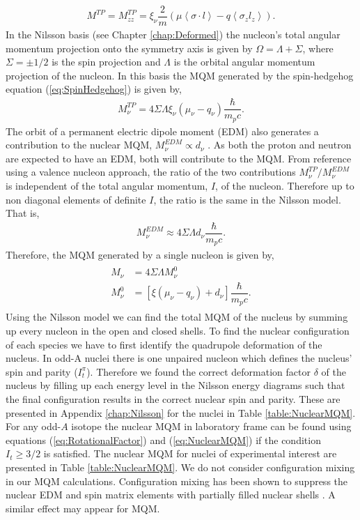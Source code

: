 \documentclass[10pt,a4paper, twoside, openright]{report}
\begin{document}
\begin{align}
M^{TP}  = M_{zz}^{TP} = \xi_{\nu}\dfrac{2}{m}\left(\mu\left<\sigma\cdot l \right> - q\left<\sigma_z l_z\right>\right) .
\end{align}
In the Nilsson basis (see Chapter \ref{chap:Deformed}) the nucleon's total angular momentum projection onto the symmetry axis is given by $\Omega = \Lambda + \Sigma$, where $\Sigma = \pm 1/2$ is the spin projection and $\Lambda$ is the orbital angular momentum projection of the nucleon. In this basis the MQM  generated by the spin-hedgehog equation (\ref{eq:SpinHedgehog}) is given by,
\begin{align}
M^{TP}_{\nu} = 4\Sigma\Lambda\xi_{\nu}\left(\mu_{\nu} - q_{\nu}\right)\dfrac{\hbar}{m_p c}.
\end{align} 
The orbit of a permanent electric dipole moment (EDM) also  generates a contribution to the nuclear MQM, $M_{\nu}^{EDM} \propto d_{\nu}$ \cite{Khriplovich1976}. As both the proton and neutron are expected to have an EDM, both will contribute to the MQM. From reference \cite{Flambaum2014} using a valence nucleon approach, the ratio of the two contributions $M^{TP}_{\nu}/M_{\nu}^{EDM}$ is independent of the total angular momentum, $I$, of the nucleon. Therefore up to non diagonal elements of definite $I$, the ratio is the same in the Nilsson model. That is,
\begin{align}
M_{\nu}^{EDM} \approx  4\Sigma\Lambda d_{\nu}\dfrac{\hbar}{m_p c}.
\end{align}
Therefore, the MQM generated by a single nucleon is given by,
\begin{align}\label{eq:NuclearMQM} 
\begin{split}
M_{\nu} &= 4\Sigma\Lambda M_{\nu}^0 \\ 
M_{\nu}^0 &= \left[\xi\left(\mu_{\nu} - q_{\nu}\right) + d_{\nu}\right]\dfrac{\hbar}{m_p c}. 
\end{split}
\end{align}
Using the Nilsson model we can find the total MQM of the nucleus by summing up every nucleon in the open and closed shells. To find the nuclear configuration of each species we have to first identify the quadrupole deformation of the nucleus. In  odd-A nuclei there is  one unpaired nucleon which defines the nucleus' spin  and parity ($I_t^{\pi}$). Therefore we found the correct deformation factor $\delta$ of the nucleus by filling up each energy level in the Nilsson energy diagrams \cite{BohrMottVol2} such that the final configuration results in the correct nuclear spin and parity. These are presented in Appendix \ref{chap:Nilsson} for the nuclei in Table \ref{table:NuclearMQM}.   For any odd-$A$ isotope the nuclear MQM in laboratory frame can be found  using equations (\ref{eq:RotationalFactor})  and (\ref{eq:NuclearMQM}) if the condition $I_t \geq 3/2$ is satisfied. The nuclear MQM  for nuclei of experimental interest are presented in  Table \ref{table:NuclearMQM}. We do not consider configuration mixing in our MQM calculations. Configuration mixing has been shown to suppress the nuclear EDM and spin matrix elements with partially filled nuclear shells \cite{Yoshinaga2010, Yoshinaga2014, Yamanaka2017}. A similar effect may appear for MQM. \\
\end{document}
